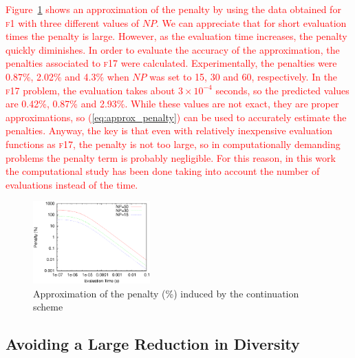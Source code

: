 \documentclass[review,3p]{elsarticle}
\begin{document}
\textcolor{red}{
Figure~\ref{fig:time} shows an approximation of the penalty by using the data obtained for \textsc{f1} with three different values of $NP$.
%
We can appreciate that for short evaluation times the penalty is large.
%
However, as the evaluation time increases, the penalty quickly diminishes.
%
In order to evaluate the accuracy of the approximation, the penalties associated to \textsc{f17} were calculated.
%
Experimentally, the penalties were 0.87\%, 2.02\% and 4.3\% when $NP$ was set to 15, 30 and 60, respectively.
%
In the \textsc{f17} problem, the evaluation takes about $3 \times 10^{-4}$ seconds, so the predicted values are
0.42\%, 0.87\% and 2.93\%.
%
While these values are not exact, they are proper approximations, so (\ref{eq:approx_penalty}) can be used to accurately estimate the penalties.
%
Anyway, the key is that even with relatively inexpensive evaluation functions as \textsc{f17}, the penalty is not too large, so
in computationally demanding problems the penalty term is probably negligible.
%
For this reason, in this work the computational study has been done taking into account the number of evaluations instead of the time.
}

\begin{figure}[!t]
\centering
\includegraphics[width=0.40\textwidth]{images/Time/timePrediction.eps}
\caption{Approximation of the penalty (\%) induced by the continuation scheme}
\label{fig:time}
\end{figure}

\subsection{Avoiding a Large Reduction in Diversity}
\end{document}
